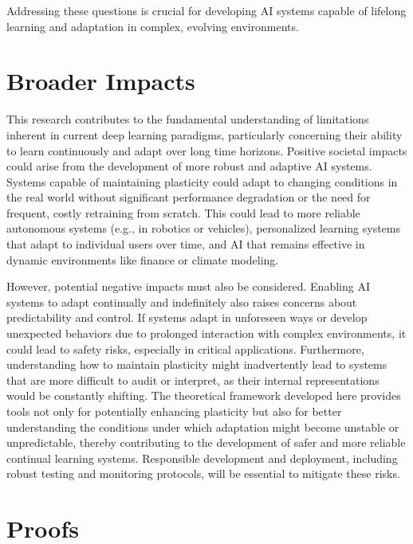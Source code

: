 \documentclass{article}
\begin{document}
Addressing these questions is crucial for developing AI systems capable of lifelong learning and adaptation in complex, evolving environments.

\section{Broader Impacts}
This research contributes to the fundamental understanding of limitations inherent in current deep learning paradigms, particularly concerning their ability to learn continuously and adapt over long time horizons. Positive societal impacts could arise from the development of more robust and adaptive AI systems. Systems capable of maintaining plasticity could adapt to changing conditions in the real world without significant performance degradation or the need for frequent, costly retraining from scratch. This could lead to more reliable autonomous systems (e.g., in robotics or vehicles), personalized learning systems that adapt to individual users over time, and AI that remains effective in dynamic environments like finance or climate modeling.

However, potential negative impacts must also be considered. Enabling AI systems to adapt continually and indefinitely also raises concerns about predictability and control. If systems adapt in unforeseen ways or develop unexpected behaviors due to prolonged interaction with complex environments, it could lead to safety risks, especially in critical applications. Furthermore, understanding how to maintain plasticity might inadvertently lead to systems that are more difficult to audit or interpret, as their internal representations would be constantly shifting. The theoretical framework developed here provides tools not only for potentially enhancing plasticity but also for better understanding the conditions under which adaptation might become unstable or unpredictable, thereby contributing to the development of safer and more reliable continual learning systems. Responsible development and deployment, including robust testing and monitoring protocols, will be essential to mitigate these risks.



\appendix



\section{Proofs}
\label{app:proofs}
\end{document}
